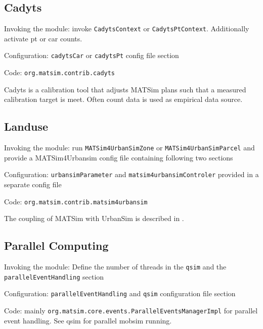 \subsection{Cadyts}
\label{sec:cadyts}
\begin{compactitem}
\item Invoking the module: invoke \lstinline|CadytsContext| or \lstinline|CadytsPtContext|. Additionally activate pt or car counts. 
\item Configuration: \lstinline|cadytsCar| or \lstinline|cadytsPt| config file section
\item Code: \lstinline|org.matsim.contrib.cadyts|
\end{compactitem}

Cadyts \citep[][]{FloetteroedEtAl_TechRep_TRANSPOR_2008} is a calibration tool that adjusts MATSim plans such that a measured calibration target is meet. Often count data is used as empirical data source.

\subsection{Landuse}
\label{sec:landuse}
\begin{compactitem}
\item Invoking the module: run \lstinline|MATSim4UrbanSimZone| or \lstinline|MATSim4UrbanSimParcel| and provide a MATSim4Urbansim config file containing following two sections
\item Configuration: \lstinline|urbansimParameter| and \lstinline|matsim4urbansimControler| provided in a separate config file
\item Code: \lstinline|org.matsim.contrib.matsim4urbansim|
\end{compactitem}

The coupling of MATSim with UrbanSim \citep[][]{Waddell_unpub_UrbanSimTutorial_2010} is described in \citet[][]{NicolaiEtAl_TechRep_VSP_2011,NicolaiEtAl_ERSA_2011}.

\subsection{Parallel Computing}
\label{sec:parallelcomputing}
\begin{compactitem}
\item Invoking the module: Define the number of threads in the \lstinline|qsim| and the \lstinline|parallelEventHandling| section
\item Configuration: \lstinline|parallelEventHandling| and \lstinline|qsim| configuration file section
\item Code: mainly \lstinline|org.matsim.core.events.ParallelEventsManagerImpl| for parallel event handling. See qsim for parallel mobsim running.
\end{compactitem}

